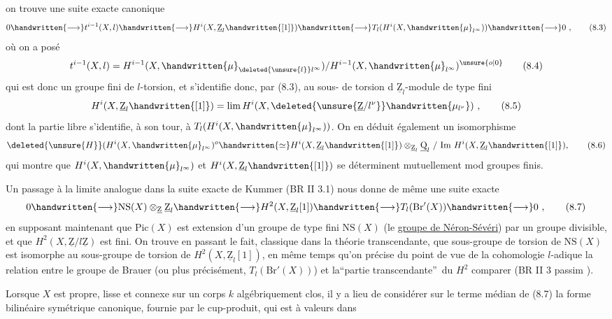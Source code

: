 on trouve une suite exacte canonique 
\[
0\handwritten{\longrightarrow}t^{i-1}(X,l)\handwritten{\longrightarrow}H^i(X,\underline{\mathrm Z}_l\handwritten{[1]})\handwritten{\longrightarrow}T_l(H^i(X,\handwritten{\mu}_{l^\infty}))\handwritten{\longrightarrow}0\ , \tag*{(8.3)}
\]
où  on a posé
\[
t^{i-1}(X,l)=H^{i-1}(X,\handwritten{\mu}_{\deleted{\unsure{l}}l^\infty})/H^{i-1}(X,\handwritten{\mu}_{l^\infty})^{\unsure{o|0}} \tag*{(8.4)}
\]
qui est donc un groupe fini de $l$-torsion, et s'identifie donc, par (8.3), au sous- de torsion d $\underline{\mathrm Z}_l$-module de type fini
\[
H^i(X,\underline{\mathrm Z}_l\handwritten{[1]})=\lim H^i(X,\deleted{\unsure{\underline{\mathrm Z}/l^\nu}}\handwritten{\mu_{l^\nu}})\ , \tag*{(8.5)}
\]
dont la partie libre s'identifie, à son tour, à $T_l(H^i(X,\handwritten{\mu}_{l^\infty}))$. On en \margin{\handwritten{!}}déduit également un isomorphisme
\[
\deleted{\unsure{H}}(H^i(X,\handwritten{\mu}_{l^\infty})^o\handwritten{\simeq} H^i(X,\underline{\mathrm Z}_l\handwritten{[1]})\otimes_{\underline{\mathrm Z}_l}\underline{\mathrm Q}_l\ /\ \mathrm{Im}\ H^i(X,\underline{\mathrm Z}_l\handwritten{[1]}), \tag*{(8.6)}
\]
qui montre que $H^i(X,\handwritten{\mu}_{l^\infty})$ et $H^i(X,\underline{\mathrm Z}_l\handwritten{[1]})$ se déterminent mutuellement mod groupes  finis.

 Un passage à la limite analogue dans la suite exacte de Kummer (BR II 3.1) nous donne de même une suite exacte
\[
0\handwritten{\longrightarrow}\mathrm{NS}(X)\otimes_{\underline{\mathrm Z}}\underline{\mathrm Z}_l\handwritten{\longrightarrow}H^2(X,\underline{\mathrm Z}_l[1])\handwritten{\longrightarrow}T_l(\mathrm{Br}'(X))\handwritten{\longrightarrow}0\ , \tag*{(8.7)}
\]
en supposant maintenant que $\mathrm{Pic}(X)$ est extension d'un groupe de type fini $\mathrm{NS}(X)$ (le \uline{groupe de Néron-Sévéri}) par un groupe divisible, et que $H^2(X,\underline{\mathrm Z}/l\underline{\mathrm Z})$ est fini. \deleted{\unsure{(}}On trouve en passant le fait, classique dans la théorie transcendante, que  sous-groupe de torsion de $\mathrm{NS}(X)$ est isomorphe au sous-groupe de torsion de $H^2(X,\underline{\mathrm Z}_l[1])$, en même temps qu'on précise du point de vue de la cohomologie $l$-adique la relation entre le groupe de Brauer (ou plus précisément, $T_l(\mathrm{Br}'(X))$) et la\textquotedblleft partie transcendante\textquotedblright\ du $H^2$ \handwritten{,} \deleted{\unsure{;}}comparer (BR II 3 passim ).

Lorsque $X$ est  propre, lisse et connexe sur un corps $k$ algébriquement clos, il y a lieu de considérer sur le terme médian de (8.7) la forme bilinéaire symétrique canonique, fournie par le cup-produit, qui est à valeurs dans

